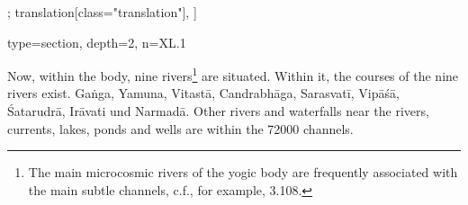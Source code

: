 \begin{alignment}[
  texts=edition[class="edition"];
  translation[class="translation"],
  ]
\begin{translation}
{  type=section,
  depth=2, 
  n=XL.1
}
\begin{tlate}[p40_01]
  Now, within the body, nine rivers\footnote{The main microcosmic rivers of the yogic body are frequently associated with the main subtle channels, c.f., for example,  3.108.} are situated. Within it, the courses of the nine rivers exist. Gaṅga, Yamuna, Vitastā, Candrabhāga, Sarasvatī, Vipāśā, Śatarudrā, Irāvati und Narmadā. Other rivers and waterfalls near the rivers, currents, lakes, ponds and wells are within the 72000 channels.
\end{tlate}
  \end{translation}
\end{alignment}
\pagebreak %
